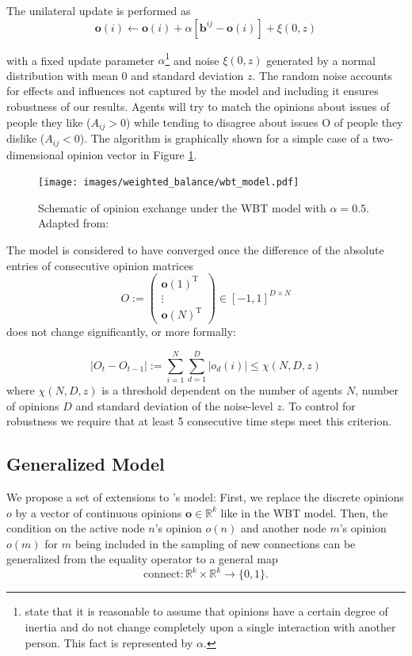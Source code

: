 \documentclass[11pt]{article}
\begin{document}
The unilateral update is performed as 
\[ 
\mathbf{o}(i)\leftarrow  \mathbf{o}(i) + \alpha \left[\mathbf{b}^{ij}-  \mathbf{o}(i)\right]+\xi(0,z)
\]

with a fixed update parameter $\alpha$\footnote{\citet{schweighofer2020} state that it is reasonable to assume that opinions have a certain degree of inertia and do not change completely upon a single interaction with another person. This fact is represented by $\alpha$.} and noise $\xi(0,z)$ generated by a normal distribution with mean $0$ and standard deviation $z$. The random noise accounts for effects and influences not captured by the model and including it ensures robustness of our results. Agents will try to match the opinions about issues of people they like ($A_{ij}>0$) while tending to disagree about issues O of people they dislike ($A_{ij}<0$).
The algorithm is graphically shown for a simple case of a two-dimensional opinion vector in Figure \ref{fig:wb}.

\begin{figure}[htb]
    \centering
    \texttt{[image: images/weighted\_balance/wbt\_model.pdf]}
    \caption{Schematic of opinion exchange under the WBT model with $\alpha = 0.5$. Adapted from: \cite{schweighofer2020}}
    \label{fig:wb}
\end{figure}

The model is considered to have converged once the difference of the absolute entries of consecutive  opinion matrices
\[
O := 
\begin{pmatrix} 
\mathbf{o}(1)^\text{T}  \\
\vdots \\
\mathbf{o}(N)^\text{T}
\end{pmatrix}  \in [-1,1]^{D \times N}
\]
does not change significantly, or more formally:

\[
|O_t - O_{t-1}| := \sum_{i=1}^N \sum_{d=1}^D |o_d(i)| \leq \chi(N,D,z)
\]
where $\chi(N,D,z)$ is a threshold dependent on the number of agents $N$, number of opinions $D$ and standard deviation of the noise-level $z$. To control for robustness we require that at least 5 consecutive time steps meet this criterion. 

\subsection{Generalized Model}\label{general}
We propose a set of extensions to \citet{holme2006nonequilibrium}'s model: First, we replace the discrete opinions $o$ by a vector of continuous opinions $\mathbf{o}\in\mathbb{R}^{k}$ like in the WBT model. Then, the condition on the active node $n$'s opinion $o(n)$ and another node $m$'s opinion $o(m)$ for $m$ being included in the sampling of new connections can be generalized from the equality operator to a general map
\[
\text{connect}:\mathbb{R}^{k}\times\mathbb{R}^{k}\to\{0,1\}.
\] 
\end{document}
